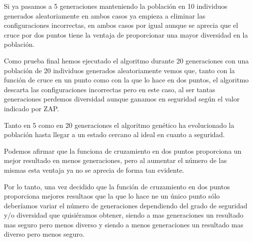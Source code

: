 \bigskip
Si ya pasamos a 5 generaciones manteniendo la población en 10 individuos generados aleatoriamente en ambos casos ya empieza a eliminar las configuraciones incorrectas, en ambos casos por igual aunque se aprecia que el cruce por dos puntos tiene la ventaja de proporcionar una mayor diversidad en la población.

\bigskip
Como prueba final hemos ejecutado el algoritmo durante 20 generaciones con una población de 20 individuos generados aleatoriamente vemos que, tanto con la función de cruce en un punto como con la que lo hace en dos puntos, el algoritmo descarta las configuraciones incorrectas pero en este caso, al ser tantas generaciones perdemos diversidad aunque ganamos en seguridad según el valor indicado por ZAP.

\bigskip
Tanto en 5 como en 20 generaciones el algoritmo genético ha evolucionado la población hasta llegar a un estado cercano al ideal en cuanto a seguridad.

\bigskip
Podemos afirmar que la funciona de cruzamiento en dos puntos proporciona un mejor resultado en menos generaciones, pero al aumentar el número de las mismas esta ventaja ya no se aprecia de forma tan evidente.

\bigskip
Por lo tanto, una vez decidido que la función de cruzamiento en dos puntos proporciona mejores resultaos que la que lo hace ne un único punto sólo deberíamos variar el número de generaciones dependiendo del grado de seguridad y/o diversidad que quisiéramos obtener, siendo a mas generaciones un resultado mas seguro pero menos diverso y siendo a menos generaciones un resultado mas diverso pero menos seguro.



